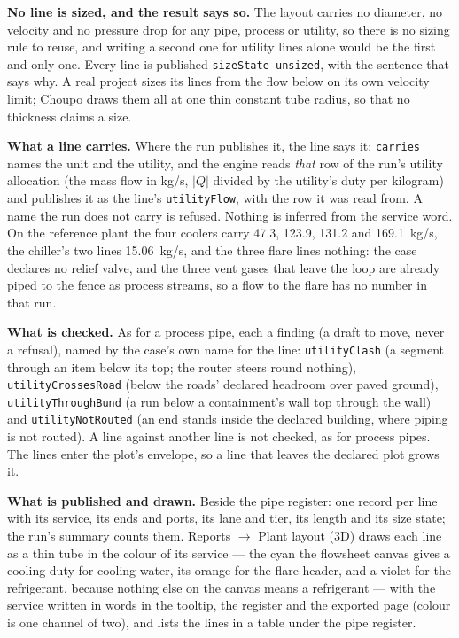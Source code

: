 \documentclass[11pt,a4paper]{article}
\begin{document}
\textbf{No line is sized, and the result says so.} The layout carries no
diameter, no velocity and no pressure drop for any pipe, process or
utility, so there is no sizing rule to reuse, and writing a second one for
utility lines alone would be the first and only one. Every line is
published \texttt{sizeState unsized}, with the sentence that says why. A
real project sizes its lines from the flow below on its own velocity
limit; Choupo draws them all at one thin constant tube radius, so that no
thickness claims a size.

\textbf{What a line carries.} Where the run publishes it, the line says
it: \texttt{carries} names the unit and the utility, and the engine reads
\emph{that} row of the run's utility allocation (the mass flow in kg/s,
$|Q|$ divided by the utility's duty per kilogram) and publishes it as the
line's \texttt{utilityFlow}, with the row it was read from. A name the run
does not carry is refused. Nothing is inferred from the service word. On
the reference plant the four coolers carry 47.3, 123.9, 131.2 and
169.1~kg/s, the chiller's two lines 15.06~kg/s, and the three flare lines
nothing: the case declares no relief valve, and the three vent gases that
leave the loop are already piped to the fence as process streams, so a
flow to the flare has no number in that run.

\textbf{What is checked.} As for a process pipe, each a finding (a draft
to move, never a refusal), named by the case's own name for the line:
\texttt{utilityClash} (a segment through an item below its top; the router
steers round nothing), \texttt{utilityCrossesRoad} (below the roads'
declared headroom over paved ground), \texttt{utilityThroughBund} (a run
below a containment's wall top through the wall) and
\texttt{utilityNotRouted} (an end stands inside the declared building,
where piping is not routed). A line against another line is not checked,
as for process pipes. The lines enter the plot's envelope, so a line that
leaves the declared plot grows it.

\textbf{What is published and drawn.} Beside the pipe register: one record
per line with its service, its ends and ports, its lane and tier, its
length and its size state; the run's summary counts them. Reports
$\rightarrow$ Plant layout (3D) draws each line as a thin tube in the
colour of its service --- the cyan the flowsheet canvas gives a cooling
duty for cooling water, its orange for the flare header, and a violet
for the refrigerant, because nothing else on the canvas means a
refrigerant --- with the service written in words in the tooltip, the
register and the exported page (colour is one channel of two), and lists
the lines in a table under the pipe register.
\end{document}
